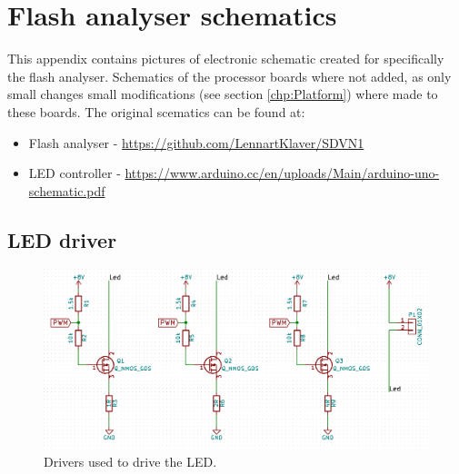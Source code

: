 \chapter{Flash analyser schematics}
\label{app_schematics}
This appendix contains pictures of electronic schematic created for specifically the flash analyser. Schematics of the processor boards where not added, as only small changes small modifications (see section \ref{chp:Platform}) where made to these boards. The original scematics can be found at:
\begin{itemize}
    \item Flash analyser - \url{https://github.com/LennartKlaver/SDVN1} 
    \item LED controller - \url{https://www.arduino.cc/en/uploads/Main/arduino-uno-schematic.pdf}
\end{itemize}


\section{LED driver}
\begin{figure}[!h]
	\includegraphics[width=\textwidth]{pics/LED_Driver.png}
	\caption{Drivers used to drive the LED.}
	\label{fig:LED_Driver}
\end{figure}